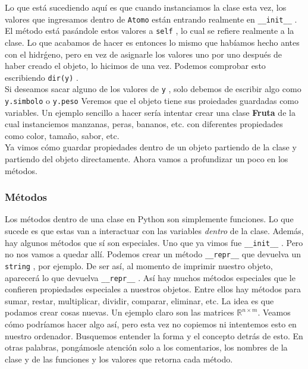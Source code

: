\documentclass[10pt,letterpaper]{article}
\newcommand{\inlinecode}[1]{
\colorbox{light-gray}{\texttt{#1}}
}
\begin{document}
Lo que est\'a sucediendo aqu\'i es que cuando instanciamos la clase esta vez, los valores que ingresamos dentro de \inlinecode{Atomo} est\'an entrando realmente en \inlinecode{\_\_init\_\_}. El m\'etodo est\'a pas\'andole estos valores a \inlinecode{self}, lo cual se refiere realmente a la clase. Lo que acabamos de hacer es entonces lo mismo que hab\'iamos hecho antes con el hidr\'geno, pero en vez de asignarle los valores uno por uno despu\'es de haber creado el objeto, lo hicimos de una vez. Podemos comprobar esto escribiendo \inlinecode{dir(y)}.\\

Si deseamos sacar alguno de los valores de \inlinecode{y}, solo debemos de escribir algo como \inlinecode{y.simbolo} o \inlinecode{y.peso} Veremos que el objeto tiene sus proiedades guardadas como variables. Un ejemplo sencillo a hacer ser\'ia intentar crear una clase \textbf{Fruta} de la cual instanciemos manzanas, peras, bananos, etc. con diferentes propiedades como color, tama\~no, sabor, etc.\\

Ya vimos c\'omo guardar propiedades dentro de un objeto partiendo de la clase y partiendo del objeto directamente. Ahora vamos a profundizar un poco en los m\'etodos.

\subsubsection{M\'etodos}
Los m\'etodos dentro de una clase en Python son simplemente funciones. Lo que sucede es que estas van a interactuar con las variables \emph{dentro} de la clase. Adem\'as, hay algunos m\'etodos que s\'i son especiales. Uno que ya vimos fue \inlinecode{\_\_init\_\_}. Pero no nos vamos a quedar all\'i. Podemos crear un m\'etodo \inlinecode{\_\_repr\_\_} que devuelva un \inlinecode{string}, por ejemplo. De ser as\'i, al momento de imprimir nuestro objeto, aparecer\'a lo que devuelva \inlinecode{\_\_repr\_\_}. As\'i hay muchos m\'etodos especiales que le confieren propiedades especiales a nuestros objetos. Entre ellos hay m\'etodos para sumar, restar, multiplicar, dividir, comparar, eliminar, etc. La idea es que podamos crear cosas nuevas. Un ejemplo claro son las matrices $\mathbb{R}^{n \times m}$. Veamos c\'omo podr\'iamos hacer algo as\'i, pero esta vez no copiemos ni intentemos esto en nuestro ordenador. Busquemos entender la forma y el concepto detr\'as de esto. En otras palabras, pong\'amosle atenci\'on solo a los comentarios, los nombres de la clase y de las funciones y los valores que retorna cada m\'etodo.\\
\end{document}
